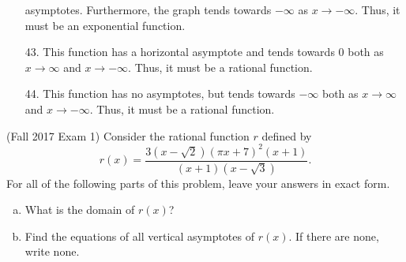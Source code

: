 \documentclass[11pt]{exam}
\begin{document}
\begin{questions}
\begin{solution}
\begin{enumerate}
    asymptotes. Furthermore, the graph tends towards \(-\infty\) as
    \(x \to -\infty\). Thus, it must be an exponential function.
  \item[43.] This function has a horizontal asymptote and tends
    towards \(0\) both as \(x \to \infty\) and \(x \to
    -\infty\). Thus, it must be a rational function.
  \item[44.] This function has no asymptotes, but tends towards
    \(-\infty\) both as \(x \to \infty\) and \(x \to -\infty\). Thus,
    it must be a rational function.
  \end{enumerate}
\end{solution}
\question (Fall 2017 Exam 1)
Consider the rational function \(r\) defined by
$$r(x) = \frac{3(x-\sqrt{2})(\pi x + 7)^2(x+1)}{(x+1)(x-\sqrt{3})}.$$
For all of the following parts of this problem, leave your answers in exact form.
\begin{enumerate}[(a)]
\item What is the domain of $r(x)$?

\item Find the equations of all vertical asymptotes of $r(x)$. If there are none, write none.


\end{enumerate}
\end{questions}
\end{document}
